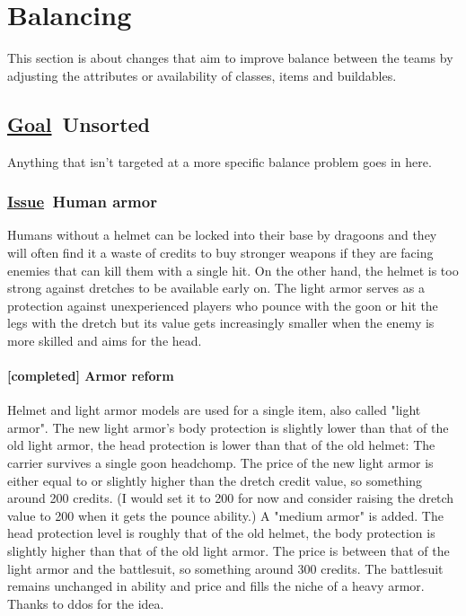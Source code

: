 \documentclass{scrartcl}
\newcommand{\goal}     [0]{\textbf{\underline{Goal}\ }}
\newcommand{\issue}    [0]{\textbf{\underline{Issue}\ }}
\newcommand{\completed}[0]{\textcolor{completed}{\textbf{[completed] }}}
\begin{document}
\section{Balancing}

This section is about changes that aim to improve balance between the teams by adjusting the attributes or availability of classes, items and buildables.

\subsection{\goal Unsorted}

Anything that isn't targeted at a more specific balance problem goes in here.

\subsubsection{\issue Human armor}

Humans without a helmet can be locked into their base by dragoons and they will often find it a waste of credits to buy stronger weapons if they are facing enemies that can kill them with a single hit. On the other hand, the helmet is too strong against dretches to be available early on. The light armor serves as a protection against unexperienced players who pounce with the goon or hit the legs with the dretch but its value gets increasingly smaller when the enemy is more skilled and aims for the head.

\paragraph{\completed Armor reform}

Helmet and light armor models are used for a single item, also called "light armor". The new light armor's body protection is slightly lower than that of the old light armor, the head protection is lower than that of the old helmet: The carrier survives a single goon headchomp. The price of the new light armor is either equal to or slightly higher than the dretch credit value, so something around 200 credits. (I would set it to 200 for now and consider raising the dretch value to 200 when it gets the pounce ability.) A "medium armor" is added. The head protection level is roughly that of the old helmet, the body protection is slightly higher than that of the old light armor. The price is between that of the light armor and the battlesuit, so something around 300 credits. The battlesuit remains unchanged in ability and price and fills the niche of a heavy armor. Thanks to ddos for the idea.
\end{document}
